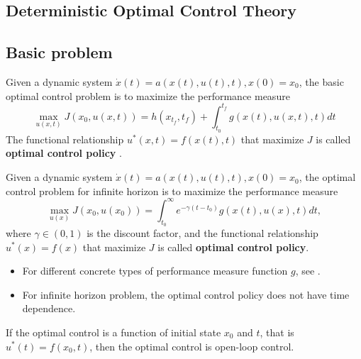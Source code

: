 
\begin{refsection}
\startcontents[chapters]
\chapter{Deterministic Optimal Control Theory}\label{ch:deterministic-optimal-control-theory}
	
\section{Basic problem}
\begin{definition}

\end{definition}

\begin{definition}
Given a dynamic system $\dot{x}(t) = a(x(t),u(t),t),x(0)=x_0$, the basic optimal control problem is to maximize the performance measure
$$\max_{u(x,t)} J(x_0,u(x,t)) = h(x_{t_f},t_f) + \int_{t_0}^{t_f} g(x(t),u(x,t),t) dt$$
The functional relationship $u^*(x,t)=f(x(t),t)$ that maximize $J$ is called \textbf{optimal control policy} .
\end{definition}

\begin{definition}
Given a dynamic system $\dot{x}(t) = a(x(t),u(t),t),x(0)=x_0$, the optimal control problem for infinite horizon is to maximize the performance measure
$$\max_{u(x)} J(x_0,u(x_0)) = \int_{t_0}^{\infty} e^{-\gamma (t-t_0)}g(x(t),u(x),t) dt,$$
where $\gamma \in (0,1)$ is the discount factor, and the functional relationship $u^*(x)=f(x)$ that maximize $J$ is called \textbf{optimal control policy}.
\end{definition}

\begin{remark}[interpretation]\hfill
\begin{itemize}
	\item For different concrete types of performance measure function $g$, see \cite[30]{kirk2012optimal}.
	\item For infinite horizon problem, the optimal control policy does not have time dependence.
\end{itemize}
\end{remark}


\begin{definition}
If the optimal control is a function of initial state $x_0$ and $t$, that is $u^*(t)=f(x_0,t)$, then the optimal control is open-loop control.
\end{definition}


\end{refsection}
